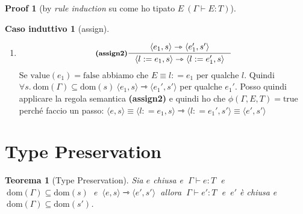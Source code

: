 \documentclass[a4paper, 10pt]{article}
\newcommand{\skipp}{\textup{skip}}
\newtheorem{thm}{Teorema}[]
\theoremstyle{definition}
\newtheorem{prf}{Proof}[]
\newtheorem{ind}{Caso induttivo}
\newcommand{\infer}[4]{\inference[\textbf{#1}]{#2}{#3}#4 }
\newcommand{\srule}[2]{\langle #1 \rangle \rightarrowtriangle \langle #2 \rangle}
\begin{document}
\begin{multicols}{2}
\begin{prf}[by \textit{rule induction} su come ho tipato $ E\ (\Gamma \vdash E\colon T) $]
\begin{ind}[assign]
\begin{enumerate}
\[			\]
			Se $ \text{value}(e_1) = \text{true} $ abbiamo che $ e_1 = n $ per qualche $ n $, $ E\equiv l\colon = n $ per qualche $ l $. Dal fatto che $ \{l\} \subseteq \text{dom}(\Gamma)\subseteq \text{dom}(s) $, derivo che $ s $ è definito in $ l $. Posso quindi applicare la regola semantica \textbf{(assign1)} e quindi ho che $ \phi(\Gamma, E, T) =\text{true} $ perché faccio un passo: 
			$ \langle e, s \rangle \equiv \srule{l\colon = n, s}{\skipp, s[l\mapsto n]}\equiv \langle e', s' \rangle $.
			\item
			\[
				\infer{(assign2)}{\srule{e_1,s}{e_1',s'}}{\srule{l:=e_1,s}{l:=e_1',s}}{}
			\]
			Se $ \text{value}(e_1) = \text{false} $ abbiamo che $ E\equiv l\colon = e_1 $ per qualche $ l $. Quindi $ \forall s.\ \text{dom}(\Gamma)\subseteq \text{dom}(s)\ \srule{e_1, s}{e_1', s'} $ per qualche $ e_1' $. Posso quindi applicare la regola semantica \textbf{(assign2)} e quindi ho che $ \phi(\Gamma, E, T) =\text{true} $ perché faccio un passo:
			$ \langle e, s \rangle \equiv \srule{l\colon= e_1, s}{l\colon= e_1', s'} \equiv \langle e', s' \rangle$
		\end{enumerate} 
	\end{ind}
\end{prf}
	
\end{multicols}

\newpage
\setcounter{thm}{0}
\setcounter{prf}{0}
\setcounter{base}{0}
\setcounter{ind}{0}
\section*{Type Preservation}
\begin{thm}[Type Preservation]
	Sia $ e $ chiusa e $\ \Gamma \vdash e\colon T\ $ e $\ \text{dom}(\Gamma) \subseteq \text{dom}(s)\ $ e $\ \srule{e, s}{e', s'} \ $ allora $\ \Gamma \vdash e'\colon T\ $ e $\ e' $ è chiusa e $\ \text{dom}(\Gamma) \subseteq \text{dom}(s') $.
\end{thm}
\end{document}
